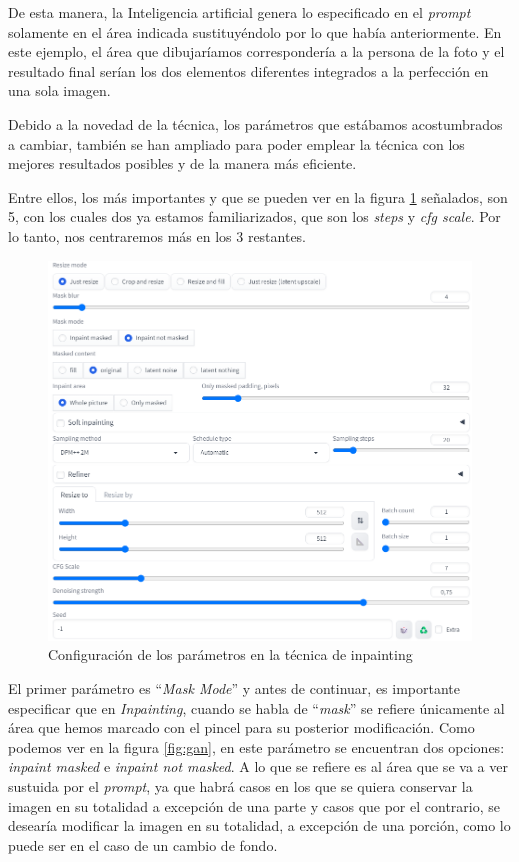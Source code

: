 De esta manera, la Inteligencia artificial genera lo especificado en el \textit{prompt} solamente en el área indicada sustituyéndolo por lo que había anteriormente. En este ejemplo, el área que dibujaríamos correspondería a la persona de la foto y el resultado final serían los dos elementos diferentes integrados a la perfección en una sola imagen. 

Debido a la novedad de la técnica, los parámetros que estábamos acostumbrados a cambiar, también se han ampliado para poder emplear la técnica con los mejores resultados posibles y de la manera más eficiente. 

Entre ellos, los más importantes y que se pueden ver en la figura \ref{fig:paramsinpainting} señalados, son 5, con los cuales dos ya estamos familiarizados, que son los \textit{steps} y \textit{cfg scale}. Por lo tanto, nos centraremos más en los 3 restantes. 

\begin{figure}[h]
	\centering
	\includegraphics[width = 0.6
	\textwidth]{Imagenes/Vectorial/parametrosinpainting.png}
	\caption{Configuración de los parámetros en la técnica de inpainting}
	\label{fig:paramsinpainting}
\end{figure}

El primer parámetro es ``\textit{Mask Mode}'' y antes de continuar, es importante especificar que en \textit{Inpainting}, cuando se habla de ``\textit{mask}'' se refiere únicamente al área que hemos marcado con el pincel para su posterior modificación. Como podemos ver en la figura \ref{fig:gan}, en este parámetro se encuentran dos opciones: \textit{inpaint masked} e \textit{inpaint not masked}. A lo que se refiere es al área que se va a ver sustuida por el \textit{prompt}, ya que habrá casos en los que se quiera conservar la imagen en su totalidad a excepción de una parte y casos que por el contrario, se desearía modificar la imagen en su totalidad, a excepción de una porción, como lo puede ser en el caso de un cambio de fondo. 

